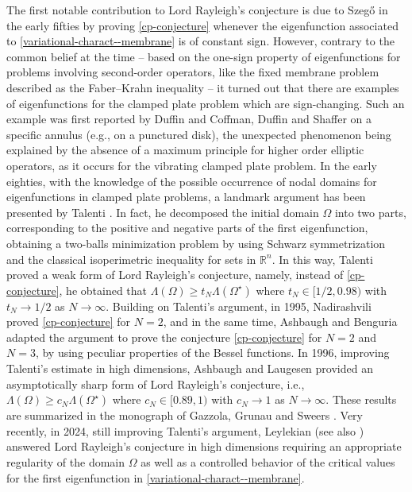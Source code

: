 \documentclass[11pt, reqno]{amsart}
\numberwithin{equation}{section}
\begin{document}
		
	The first notable contribution to Lord Rayleigh's conjecture is due to Szeg\H o \cite{Szego} in the early fifties by proving  \eqref{cp-conjecture} whenever the eigenfunction associated to \eqref{variational-charact--membrane} is of constant sign. However, contrary to the common belief at the time -- based on the one-sign property of eigenfunctions for problems involving second-order operators, like the fixed membrane problem described as the Faber--Krahn inequality --  it turned out that there are examples of eigenfunctions for the clamped plate problem which are sign-changing. Such an example was first reported by Duffin \cite{Duffin} and Coffman, Duffin and Shaffer \cite{CDS} on  a specific annulus (e.g., on  a punctured disk), 	the unexpected phenomenon being explained by the absence of a maximum principle for higher order elliptic operators, as it occurs for the vibrating clamped plate problem. In the early eighties, with the knowledge of the possible occurrence of nodal domains for eigenfunctions in clamped plate problems, a landmark argument has been presented by Talenti \cite{Talenti}. 
	In fact, he decomposed the initial domain $\Omega$ into two parts, corresponding to the positive and negative parts of the first eigenfunction, obtaining  a two-balls minimization problem by using Schwarz symmetrization and the classical isoperimetric inequality for sets in $\mathbb R^n$. In this way,  Talenti proved a weak form of Lord Rayleigh's conjecture, namely, instead of \eqref{cp-conjecture}, he obtained that $
	\Lambda(\Omega)\geq t_N \Lambda(\Omega^\star)$ where $t_N\in [1/2,0.98)$ with $t_N\to 1/2$ as $N\to \infty.$ Building on Talenti's argument, in 1995, Nadirashvili \cite{Nadirashvili} proved \eqref{cp-conjecture} for $N=2$, and in the same time, Ashbaugh and Benguria \cite{A-B-Duke} adapted the argument to prove the conjecture \eqref{cp-conjecture} for $N=2$ and $N=3$, by using peculiar properties of the Bessel functions. In 1996, improving Talenti's estimate in high dimensions, Ashbaugh and Laugesen \cite{A-L-Pisa} provided an asymptotically sharp form of Lord Rayleigh's conjecture, i.e., $
	\Lambda(\Omega)\geq c_N \Lambda(\Omega^\star)$ where $c_N\in [0.89,1)$ with $c_N\to 1$ as $N\to \infty.$ These results are summarized  in the monograph of Gazzola, Grunau and Sweers \cite[Chapter 3]{GGS}. 
 Very recently, in 2024, still improving Talenti's argument,  Leylekian \cite{Leylekian-ARMA} (see also \cite{Leylekian-1})  answered Lord Rayleigh's conjecture in high dimensions requiring  an appropriate   regularity of the domain $\Omega$ as well as a controlled behavior of the critical values for the first eigenfunction in \eqref{variational-charact--membrane}. 
	
\end{document}
